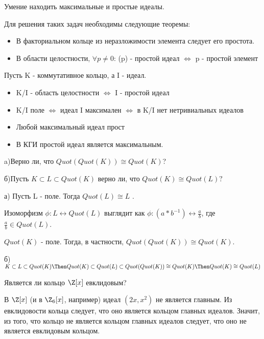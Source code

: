 \begin{problem}[20 (4.10)]
	Умение находить максимальные и простые идеалы.	
\end{problem}
\begin{solution}
	Для решения таких задач необходимы следующие теоремы:
	\begin{itemize}
		\item В факториальном кольце из неразложимости элемента следует его простота.
		\item В области целостности, $\forall p \neq 0$: (p) - простой идеал $\Leftrightarrow$ p - простой элемент
	\end{itemize}
	Пусть K - коммутативное кольцо, а I - идеал.
	\begin{itemize}
		\item K/I - область целостности $\Leftrightarrow$ I - простой идеал
		\item K/I поле $\Leftrightarrow$
		идеал I максимален $\Leftrightarrow$
		в K/I нет нетривиальных идеалов
		\item Любой максимальный идеал прост
		\item В КГИ простой идеал является максимальным.
	\end{itemize}
\end{solution}

\begin{problem}[21 (5.3)]
a)Верно ли, что $Quot(Quot(K)) \cong Quot(K)$?

б)Пусть $K \subset L \subset Quot(K)$ верно ли, что $Quot(K) \cong Quot(L)?$ 
\end{problem}
\begin{solution}
	а) Пусть L - поле. Тогда $Quot(L) \cong L$ .
	
	Изоморфизм $\phi : L \leftrightarrow Quot(L)$ выглядит как $\phi: (a * b^{-1}) \leftrightarrow \frac{a}{b}$, где $\frac{a}{b} \in Quot(L)$.
	
	$Quot(K)$ - поле. Тогда, в частности, $Quot(Quot(K)) \cong Quot(K)$.
	
	б) $K \subset L \subset Quot(K) \Then Quot(K) \subset Quot(L) \subset Quot(Quot(K)) \cong Quot(K) \Then Quot(K) \cong Quot(L)$ 
\end{solution}

\begin{problem}[22 (5.4)]
	Является ли кольцо $\Z[x]$ евклидовым?
\end{problem}
\begin{solution}
	В $\Z[x]$ (и в $\Z_6[x]$, например) идеал $(2x, x^2)$ не является главным. Из евклидовости кольца следует, что оно является кольцом главных идеалов. Значит, из того, что кольцо не является кольцом главных идеалов следует, что оно не является евклидовым кольцом.
\end{solution}

